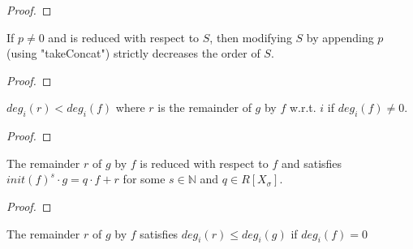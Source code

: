 \begin{proof}
    \leanok
\end{proof}

\begin{theorem}
    \label{thm:takeConcat_lt_of_reducedToSet}
    \leanok
    If $p \neq 0$ and is reduced with respect to $S$, then modifying $S$ by appending $p$ (using "takeConcat") strictly decreases the order of $S$.
\end{theorem}

\begin{proof}
    \leanok
\end{proof}

\begin{lemma}
    \label{lem:degreeOf_pseudoOf_remainder_lt_of_degreeOf_ne_zero}
    \leanok
    $deg_i(r) < deg_i(f)$ where $r$ is the remainder of $g$ by $f$ w.r.t. $i$ if $deg_i(f) \ne 0$.
\end{lemma}

\begin{proof}
    \leanok
\end{proof}

\begin{theorem}
    \label{thm:pseudo_remainder_isRemainder}
    \leanok
    The remainder $r$ of $g$ by $f$ is reduced with respect to $f$ and
    satisfies $init(f)^s \cdot g = q \cdot f + r$ for some $s \in \mathbb{N}$ and $q \in R[X_{\sigma}]$.
\end{theorem}

\begin{proof}
    \leanok
\end{proof}

\begin{lemma}
    \label{lem:degreeOf_pseudo_remainder_le_of_degreeOf_eq_zero}
    \leanok
    The remainder $r$ of $g$ by $f$ satisfies $deg_i(r) \le deg_i(g)$ if $deg_i(f) = 0$
\end{lemma}

